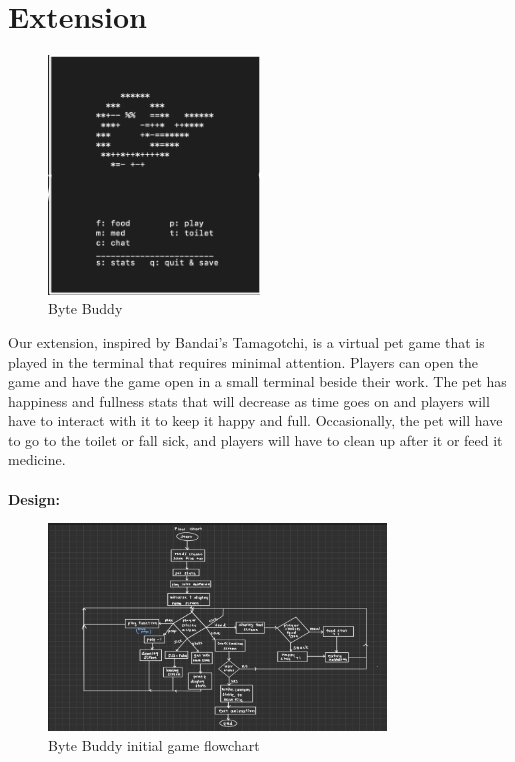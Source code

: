 \documentclass[11pt]{article}
\begin{document}
\section{Extension}
\begin{figure}[t]
    \centering
    \includegraphics[width=0.5\textwidth]{tamagotchi.png}
    \caption{Byte Buddy}
    \label{fig:tamagotchi}
\end{figure}
Our extension, inspired by Bandai’s Tamagotchi, is a virtual pet game that is played in the terminal that requires minimal attention. Players can open the game and have the game open in a small terminal beside their work. The pet has happiness and fullness stats that will decrease as time goes on and players will have to interact with it to keep it happy and full. Occasionally, the pet will have to go to the toilet or fall sick, and players will have to clean up after it or feed it medicine.\\\\
\textbf{Design:}\\
\begin{figure}[t]
    \centering
    \includegraphics[width=0.8\textwidth]{tama_flow.png}
    \caption{Byte Buddy initial game flowchart}
    \label{fig:Game Design Flow}
\end{figure}
\end{document}

